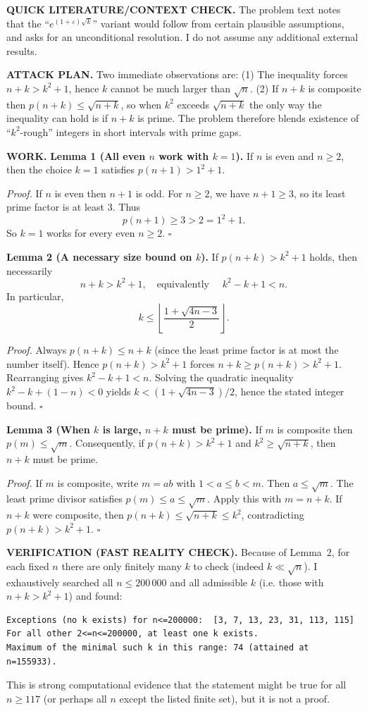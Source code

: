 \textbf{QUICK LITERATURE/CONTEXT CHECK.}
The problem text notes that the ``$e^{(1+\varepsilon)\sqrt{k}}$'' variant would follow from certain plausible assumptions, and asks for an unconditional resolution. I do not assume any additional external results.

\textbf{ATTACK PLAN.}
Two immediate observations are:
(1) The inequality forces $n+k>k^{2}+1$, hence $k$ cannot be much larger than $\sqrt n$.
(2) If $n+k$ is composite then $p(n+k)\le\sqrt{n+k}$, so when $k^{2}$ exceeds $\sqrt{n+k}$ the only way the inequality can hold is if $n+k$ is prime.
The problem therefore blends existence of ``$k^{2}$-rough'' integers in short intervals with prime gaps.

\textbf{WORK.}
\textbf{Lemma 1 (All even $n$ work with $k=1$).}
If $n$ is even and $n\ge 2$, then the choice $k=1$ satisfies $p(n+1)>1^{2}+1$.

\emph{Proof.}
If $n$ is even then $n+1$ is odd. For $n\ge2$, we have $n+1\ge3$, so its least prime factor is at least $3$. Thus
\[p(n+1)\ge 3>2=1^{2}+1.
\]
So $k=1$ works for every even $n\ge2$.
\hfill$\square$

\textbf{Lemma 2 (A necessary size bound on $k$).}
If $p(n+k)>k^{2}+1$ holds, then necessarily
\[n+k>k^{2}+1,\quad\text{equivalently }\quad k^{2}-k+1<n.
\]
In particular,
\[k\le \left\lfloor\frac{1+\sqrt{4n-3}}{2}\right\rfloor.
\]

\emph{Proof.}
Always $p(n+k)\le n+k$ (since the least prime factor is at most the number itself). Hence $p(n+k)>k^{2}+1$ forces $n+k\ge p(n+k)>k^{2}+1$.
Rearranging gives $k^{2}-k+1<n$.
Solving the quadratic inequality $k^{2}-k+(1-n)<0$ yields
$k<(1+\sqrt{4n-3})/2$, hence the stated integer bound.
\hfill$\square$

\textbf{Lemma 3 (When $k$ is large, $n+k$ must be prime).}
If $m$ is composite then $p(m)\le \sqrt m$. Consequently, if $p(n+k)>k^{2}+1$ and $k^{2}\ge \sqrt{n+k}$, then $n+k$ must be prime.

\emph{Proof.}
If $m$ is composite, write $m=ab$ with $1<a\le b<m$. Then $a\le \sqrt m$. The least prime divisor satisfies $p(m)\le a\le \sqrt m$.
Apply this with $m=n+k$. If $n+k$ were composite, then $p(n+k)\le\sqrt{n+k}\le k^{2}$, contradicting $p(n+k)>k^{2}+1$.
\hfill$\square$

\textbf{VERIFICATION (FAST REALITY CHECK).}
Because of Lemma~2, for each fixed $n$ there are only finitely many $k$ to check (indeed $k\ll\sqrt n$). I exhaustively searched all $n\le 200\,000$ and all admissible $k$ (i.e. those with $n+k>k^{2}+1$) and found:
\begin{verbatim}
Exceptions (no k exists) for n<=200000:  [3, 7, 13, 23, 31, 113, 115]
For all other 2<=n<=200000, at least one k exists.
Maximum of the minimal such k in this range: 74 (attained at n=155933).
\end{verbatim}
This is strong computational evidence that the statement might be true for all $n\ge 117$ (or perhaps all $n$ except the listed finite set), but it is not a proof.

